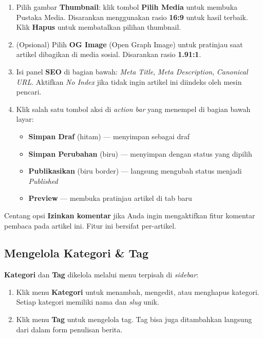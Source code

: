 \begin{enumerate}
  \item Pilih gambar \textbf{Thumbnail}: klik tombol \textbf{Pilih Media} untuk membuka
        Pustaka Media. Disarankan menggunakan rasio \textbf{16:9} untuk hasil terbaik.
        Klik \textbf{Hapus} untuk membatalkan pilihan thumbnail.
  \item (Opsional) Pilih \textbf{OG Image} (Open Graph Image) untuk pratinjau saat artikel
        dibagikan di media sosial. Disarankan rasio \textbf{1.91:1}.
  \item Isi panel \textbf{SEO} di bagian bawah: \textit{Meta Title}, \textit{Meta Description},
        \textit{Canonical URL}. Aktifkan \textit{No Index} jika tidak ingin artikel ini diindeks
        oleh mesin pencari.
  \item Klik salah satu tombol aksi di \textit{action bar} yang menempel di bagian bawah layar:
        \begin{itemize}
          \item \textbf{Simpan Draf} (hitam) --- menyimpan sebagai draf
          \item \textbf{Simpan Perubahan} (biru) --- menyimpan dengan status yang dipilih
          \item \textbf{Publikasikan} (biru border) --- langsung mengubah status menjadi \textit{Published}
          \item \textbf{Preview} --- membuka pratinjau artikel di tab baru
        \end{itemize}
\end{enumerate}

\begin{notebox}
  Centang opsi \textbf{Izinkan komentar} jika Anda ingin mengaktifkan fitur
  komentar pembaca pada artikel ini. Fitur ini bersifat per-artikel.
\end{notebox}

\subsection{Mengelola Kategori \& Tag}

\textbf{Kategori} dan \textbf{Tag} dikelola melalui menu terpisah di \textit{sidebar}:

\begin{enumerate}
  \item Klik menu \textbf{Kategori} untuk menambah, mengedit, atau menghapus kategori.
        Setiap kategori memiliki nama dan \textit{slug} unik.
  \item Klik menu \textbf{Tag} untuk mengelola tag. Tag bisa juga ditambahkan
        langsung dari dalam form penulisan berita.
\end{enumerate}

